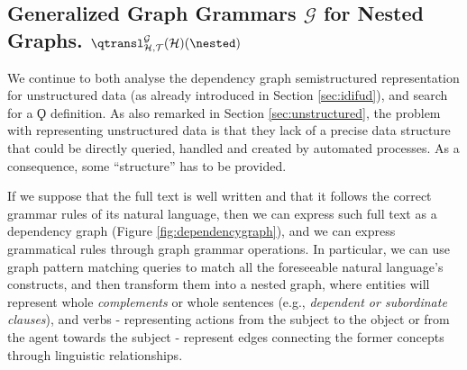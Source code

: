
\subsection{Generalized Graph Grammars $\mathcal{G}$ for Nested Graphs. $\qtransl_{\mathcal{H},\mathcal{T}}^{\mathcal{G}}(\mathcal{H})(\nested)$}\label{subsec:gggSec}\label{sec:semistructunstradata}
We continue to both analyse the dependency graph semistructured representation for unstructured data (as already introduced in Section \vref{sec:idifud}), and search for a $\Qoppa$ definition. As also remarked in Section \vref{sec:unstructured}, the problem with representing unstructured data is that they lack of a precise data structure that could be directly queried, handled and created by automated processes. As a consequence, some ``structure'' has to be provided.



	If we suppose that the full text is well written and that it follows the correct grammar rules of its natural language, then we can express such full text as a dependency graph (Figure \vref{fig:dependencygraph}), and we can express grammatical rules through graph grammar operations. In particular, we can use graph pattern matching queries to match all the foreseeable natural language's constructs, and then transform them into a nested graph, where entities will represent whole \textit{complements} or whole sentences (e.g., \textit{dependent or subordinate clauses}), and verbs - representing actions from the subject to the object or from the agent towards the subject - represent edges connecting the former concepts through linguistic relationships. 
	

